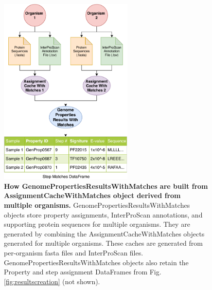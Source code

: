 \begin{figure}[!ht]
  \centering
\includegraphics[width=0.60\textwidth]{media/assignment_results_with_matches_overview.pdf}
	 \caption[How GenomePropertiesResultsWithMatches are built from 
AssignmentCacheWithMatches object derived from multiple organisms.]{\textbf{How 
GenomePropertiesResultsWithMatches are built from AssignmentCacheWithMatches 
object derived from multiple organisms.} GenomePropertiesResultsWithMatches 
objects store property assignments, InterProScan annotations, and supporting 
protein sequences for multiple organisms. They are generated by combining the 
AssignmentCacheWithMatches objects generated for multiple organisms. These 
caches are generated from per-organism \gls{fasta} files and InterProScan files. 
GenomePropertiesResultsWithMatches objects also retain the Property and step 
assignment DataFrames from Fig. \ref{fig:resultscreation} (not shown).}
	 \label{fig:resultswithmatchescreation}
\end{figure} 

